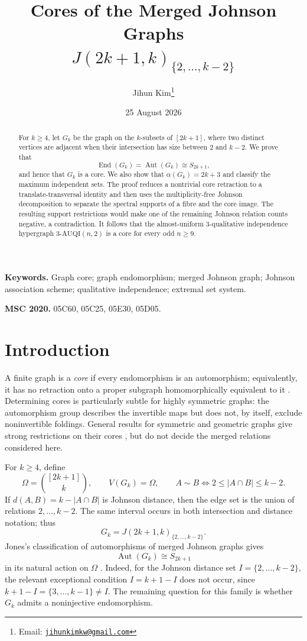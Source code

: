 \documentclass[11pt]{article}
\title{Cores of the Merged Johnson Graphs\\
$J(2k+1,k)_{\{2,\ldots,k-2\}}$}
\author{Jihun Kim\thanks{Email:
\href{mailto:jihunkimkw@gmail.com}{\texttt{jihunkimkw@gmail.com}}}}
\date{25 August 2026}
\theoremstyle{plain}
\theoremstyle{remark}
\newcommand{\Aut}{\operatorname{Aut}}
\newcommand{\End}{\operatorname{End}}
\begin{document}
\maketitle

\begin{abstract}
For $k\ge4$, let $G_k$ be the graph on the $k$-subsets of $[2k+1]$, where
two distinct vertices are adjacent when their intersection has size between
$2$ and $k-2$.  We prove that
\[
 \End(G_k)=\Aut(G_k)\cong S_{2k+1},
\]
and hence that $G_k$ is a core.  We also show that
$\alpha(G_k)=2k+3$ and classify the maximum independent sets.  The proof
reduces a nontrivial core retraction to a translate-transversal identity and
then uses the multiplicity-free Johnson decomposition to separate the
spectral supports of a fibre and the core image.  The resulting support
restrictions would make one of the remaining Johnson relation counts
negative, a contradiction.  It follows that the almost-uniform
$3$-qualitative independence hypergraph
$3\text{-}\mathrm{AUQI}(n,2)$ is a core for every odd $n\ge9$.
\end{abstract}

\noindent\textbf{Keywords.}
Graph core; graph endomorphism; merged Johnson graph; Johnson association
scheme; qualitative independence; extremal set system.

\medskip
\noindent\textbf{MSC 2020.}
05C60, 05C25, 05E30, 05D05.

\section{Introduction}

A finite graph is a \emph{core} if every endomorphism is an automorphism;
equivalently, it has no retraction onto a proper subgraph homomorphically
equivalent to it \cite{HellNesetril1992,HahnTardif1997}.  Determining cores
is particularly subtle for highly symmetric graphs: the automorphism group
describes the invertible maps but does not, by itself, exclude
noninvertible foldings.  General results for symmetric and geometric graphs
give strong restrictions on their cores
\cite{CameronKazanidis2008,GodsilRoyle2011,Roberson2013}, but do not decide
the merged relations considered here.

For $k\ge4$, define
\begin{equation}\label{eq:def-Gk}
 \Omega=\binom{[2k+1]}k,\qquad
 V(G_k)=\Omega,\qquad
 A\sim B\iff 2\le |A\cap B|\le k-2.
\end{equation}
If $d(A,B)=k-|A\cap B|$ is Johnson distance, then the edge set is the
union of relations $2,\ldots,k-2$.  The same interval occurs in both
intersection and distance notation; thus
\[
 G_k=J(2k+1,k)_{\{2,\ldots,k-2\}}.
\]
Jones's classification of
automorphisms of merged Johnson graphs gives
\begin{equation}\label{eq:aut}
 \Aut(G_k)\cong S_{2k+1}
\end{equation}
in its natural action on $\Omega$ \cite[Theorem~2]{Jones2005}.  Indeed, for
the Johnson distance set $I=\{2,\ldots,k-2\}$, the relevant exceptional condition
$I=k+1-I$ does not occur, since
$k+1-I=\{3,\ldots,k-1\}\ne I$.  The remaining question for this family is
whether $G_k$ admits a noninjective endomorphism.
\end{document}
